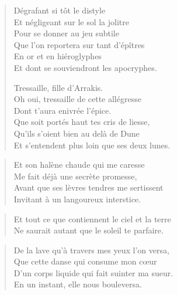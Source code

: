 \begin{verse}
  Dégrafant si tôt le distyle\\  %
  	Et négligeant sur le sol la jolitre\\  %
  Pour se donner au jeu subtile\\  %
  Que l’on reportera sur tant d’épîtres\\  %
  En or et en hiéroglyphes\\  %
  Et dont se souviendront les apocryphes.

  Tressaille, fille d’Arrakis.\\  %
  Oh oui, tressaille de cette allégresse\\  %
  Dont t’aura enivrée l’épice.\\  %
  Que soit portés haut tes cris de liesse,\\  %
  Qu’ils s’oient bien au delà de Dune\\  %
  Et s’entendent plus loin que ses deux lunes.
\end{verse}

\begin{verse}%
  \quatrain%
  Et son halène chaude qui me caresse\\  %
  Me fait déjà une secrète promesse,\\  %
  Avant que ses lèvres tendres me sertissent\\  %
  Invitant à un langoureux interstice.
\end{verse}

\begin{verse}%
  \distique%
  Et tout ce que contiennent le ciel et la terre\\  %
  Ne saurait autant que le soleil te parfaire.
\end{verse}

\begin{verse}%
  \quatrain%
  De la lave qu’à travers mes yeux l’on versa,\\  %
  Que cette danse qui consume mon cœur\\  %
  D’un corps liquide qui fait suinter ma sueur.\\  %
  En un instant, elle nous bouleversa.
\end{verse}

